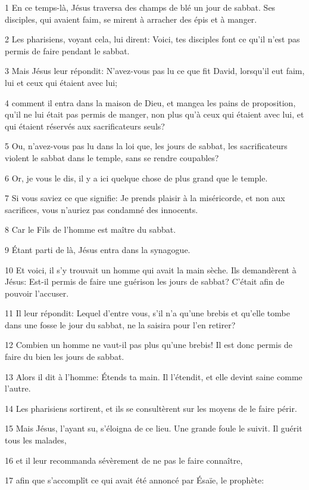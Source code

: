 \par 1 En ce temps-là, Jésus traversa des champs de blé un jour de sabbat. Ses disciples, qui avaient faim, se mirent à arracher des épis et à manger.
\par 2 Les pharisiens, voyant cela, lui dirent: Voici, tes disciples font ce qu'il n'est pas permis de faire pendant le sabbat.
\par 3 Mais Jésus leur répondit: N'avez-vous pas lu ce que fit David, lorsqu'il eut faim, lui et ceux qui étaient avec lui;
\par 4 comment il entra dans la maison de Dieu, et mangea les pains de proposition, qu'il ne lui était pas permis de manger, non plus qu'à ceux qui étaient avec lui, et qui étaient réservés aux sacrificateurs seuls?
\par 5 Ou, n'avez-vous pas lu dans la loi que, les jours de sabbat, les sacrificateurs violent le sabbat dans le temple, sans se rendre coupables?
\par 6 Or, je vous le dis, il y a ici quelque chose de plus grand que le temple.
\par 7 Si vous saviez ce que signifie: Je prends plaisir à la miséricorde, et non aux sacrifices, vous n'auriez pas condamné des innocents.
\par 8 Car le Fils de l'homme est maître du sabbat.
\par 9 Étant parti de là, Jésus entra dans la synagogue.
\par 10 Et voici, il s'y trouvait un homme qui avait la main sèche. Ils demandèrent à Jésus: Est-il permis de faire une guérison les jours de sabbat? C'était afin de pouvoir l'accuser.
\par 11 Il leur répondit: Lequel d'entre vous, s'il n'a qu'une brebis et qu'elle tombe dans une fosse le jour du sabbat, ne la saisira pour l'en retirer?
\par 12 Combien un homme ne vaut-il pas plus qu'une brebis! Il est donc permis de faire du bien les jours de sabbat.
\par 13 Alors il dit à l'homme: Étends ta main. Il l'étendit, et elle devint saine comme l'autre.
\par 14 Les pharisiens sortirent, et ils se consultèrent sur les moyens de le faire périr.
\par 15 Mais Jésus, l'ayant su, s'éloigna de ce lieu. Une grande foule le suivit. Il guérit tous les malades,
\par 16 et il leur recommanda sévèrement de ne pas le faire connaître,
\par 17 afin que s'accomplît ce qui avait été annoncé par Ésaïe, le prophète:
